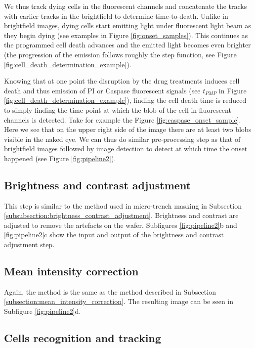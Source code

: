 \documentclass[pdftex,12pt,a4paper]{report}
\begin{document}
We thus track dying cells in the fluorescent channels and concatenate the tracks with earlier tracks in the brightfield to determine time-to-death. Unlike in brightfield images, dying cells start emitting light under fluorescent light beam as they begin dying (see examples in Figure \ref{fig:onset_samples}). This continues as the programmed cell death advances and the emitted light becomes even brighter (the progression of the emission follows roughly the step function, see Figure \ref{fig:cell_death_determination_example}).

Knowing that at one point the disruption by the drug treatments induces cell death and thus emission of PI or Caspase fluorescent signals (see $t_{PMP}$ in Figure \ref{fig:cell_death_determination_example}), finding the cell death time is reduced to simply finding the time point at which the blob of the cell in fluorescent channels is detected. Take for example the Figure \ref{fig:caspase_onset_sample}. Here we see that on the upper right side of the image there are at least two blobs visible in the naked eye. We can thus do similar pre-processing step as that of brightfield images followed by image detection to detect at which time the onset happened (see Figure \ref{fig:pipeline2}).

\subsection{Brightness and contrast adjustment}

This step is similar to the method used in micro-trench masking in Subsection \ref{subsubsection:brightness_contrast_adjustment}. Brightness and contrast are adjusted to remove the artefacts on the wafer. Subfigures \ref{fig:pipeline2}b and \ref{fig:pipeline2}c show the input and output of the brightness and contrast adjustment step.

\subsection{Mean intensity correction}

Again, the method is the same as the method described in Subsection \ref{subsection:mean_intensity_correction}. The resulting image can be seen in Subfigure \ref{fig:pipeline2}d.

\subsection{Cells recognition and tracking}
\end{document}
